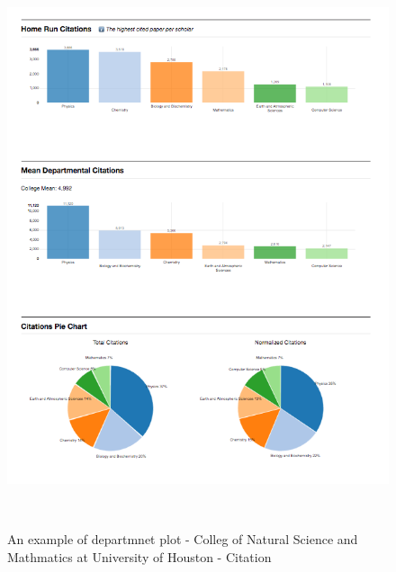 \begin{figure}
  \centering
  \includegraphics[width=1\textwidth]{figures/Coll-Cit}
  \caption{An example of departmnet plot - Colleg of Natural Science and Mathmatics at University of Houston - Citation}~\label{fig:DP-College1}
\end{figure}

